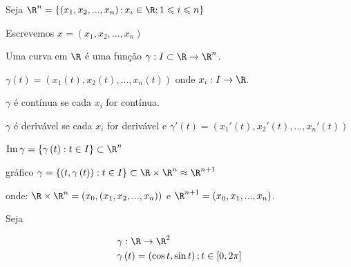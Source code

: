 \documentclass{book}
\begin{document}
Seja $\R^n = \left\{ {\left( {x_1 ,x_2 ,...,x_n } \right);x_i  \in \R;1 \leqslant i \leqslant n} \right\}$

Escrevemos $x = \left( {x_1 ,x_2 ,...,x_n } \right)$

\begin{defn}
    Uma curva em $\R$ \'e uma fun\c c\~ao $\gamma :I \subset \R \to \R^n$.

    $\gamma \left( t \right) = \left( {x_1 \left( t \right),x_2 \left( t \right),...,x_n \left( t \right)} \right)$ onde $x_i :I \to \R$.

$\gamma$ \'e cont\'inua se cada $x_i$ for cont\'inua.

    $\gamma$ \'e deriv\'avel se cada $x_i$ for deriv\'avel e $\gamma '\left( t \right) = \left( {x_1 '\left( t \right),x_2 '\left( t \right),...,x_n '\left( t \right)} \right)$

    $\operatorname{Im} \gamma  = \left\{ {\gamma \left( t \right):t \in I} \right\} \subset \R^n$

    gr\'afico $\gamma  = \left\{ {\left( {t,\gamma \left( t \right)} \right):t \in I} \right\} \subset \R \times \R^n  \approx \R^{n + 1}$

    onde: $\R \times \R^n  = \left( {x_0 ,\left( {x_1 ,x_2 ,...,x_n } \right)} \right)$ e $\R^{n + 1}  = \left( {x_0 ,x_1 ,...,x_n } \right)$.
\end{defn}

\begin{ex}
Seja

\[
\begin{gathered}
\gamma :\R \to \R^2  \hfill \\
  \gamma \left( t \right) = \left( {\cos t,\sin t} \right);t \in \left[ {0,2\pi } \right] \hfill \\
\end{gathered}
\]
\end{ex}
\end{document}
